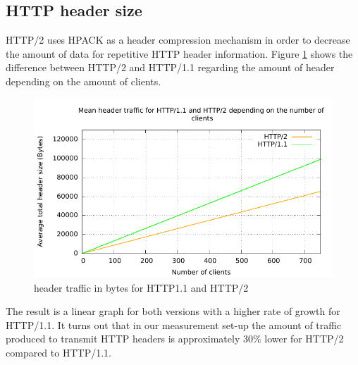 \subsection{HTTP header size}
\label{subsec:header_size}

HTTP/2 uses HPACK \cite{hpack} as a header compression mechanism in order to decrease the amount of data for repetitive HTTP header information. Figure \ref{fig:headersize} shows the difference between HTTP/2 and HTTP/1.1 regarding the amount of header depending on the amount of clients.
\begin{figure}[H]
	\centering
	\includegraphics[scale=1,trim=0.0cm .0cm .0cm .0cm,clip]{images/headertraffic.pdf}
	\caption{header traffic in bytes for HTTP1.1 and HTTP/2}
	\label{fig:headersize}
\end{figure}
The result is a linear graph for both versions with a higher rate of growth for HTTP/1.1. It turns out that in our measurement set-up the amount of traffic produced to transmit HTTP headers is approximately 30\% lower for HTTP/2 compared to HTTP/1.1. 
